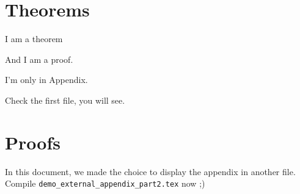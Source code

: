 \documentclass{article}
\begin{document}
\section{Theorems}

\begin{thmE}
  I am a theorem
\end{thmE}
\begin{proofE}
  And I am a proof.
\end{proofE}

\begin{thmE}
  I'm only in Appendix.
\end{thmE}
\begin{proofE}
  Check the first file, you will see.
\end{proofE}

\section{Proofs}

In this document, we made the choice to display the appendix in another file.  Compile \verb|demo_external_appendix_part2.tex| now ;)
\end{document}
